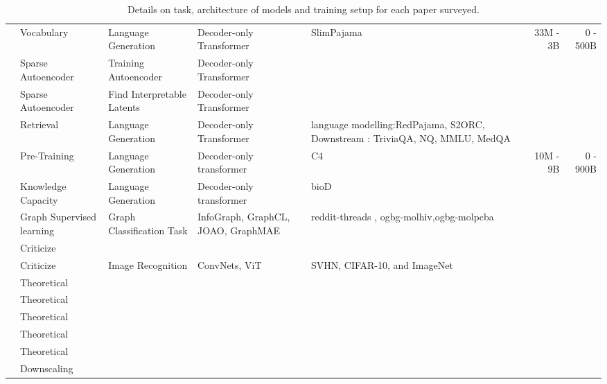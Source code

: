 \begin{table*}[htbp]
{\begin{tabular}{p{30mm} p{30mm} p{50mm} p{50mm} p{80mm} rr}
    \citet{tao_scaling_2024} & Vocabulary & Language Generation & Decoder-only Transformer &  SlimPajama  & 33M - 3B & 0 - 500B \\
    \citet{circuits_nodate} & Sparse Autoencoder & Training Autoencoder & Decoder-only Transformer &       &       &  \\
    \citet{gao_scaling_2024} & Sparse Autoencoder & Find Interpretable Latents & Decoder-only Transformer &       &       &  \\
    \citet{shao_scaling_2024} & Retrieval & Language Generation & Decoder-only Transformer & language modelling:RedPajama, S2ORC,  Downstream : TriviaQA, NQ, MMLU, MedQA &       &  \\
    \citet{muennighoff_scaling_2023} & Pre-Training & Language Generation & Decoder-only transformer & C4 & 10M - 9B & 0 - 900B \\
    \citet{allen-zhu_physics_2024} & Knowledge Capacity & Language Generation & Decoder-only transformer &   bioD    &       &  \\
    \citet{ma_neural_2024} & Graph Supervised learning & Graph Classification Task & InfoGraph, GraphCL, JOAO, GraphMAE & reddit-threads , ogbg-molhiv,ogbg-molpcba &       &  \\
    \citet{diaz_scaling_2024} & Criticize &       &       &       &       &  \\
    \citet{sorscher_beyond_2023} & Criticize & Image Recognition & ConvNets, ViT & SVHN, CIFAR-10, and ImageNet &       &  \\
    \citet{bahri_explaining_2021} & Theoretical &       &       &       &       &  \\
    \citet{bordelon_dynamical_2024} & Theoretical &       &       &       &       &  \\
    \citet{hutter_learning_2021} & Theoretical &       &       &       &       &  \\
    \citet{lin2024scalinglawslinearregression} & Theoretical &       &       &       &       &  \\
    \citet{sharma_neural_2020} & Theoretical &       &       &       &       &  \\
    \citet{jin_cost_2023} & Downscaling &       &       &       &       &  \\
    \cline{1-7}
    \end{tabular}%
    }
    \caption{Details on task, architecture of models and training setup for each paper surveyed.}
  \label{tab:database1}%
\end{table*}%
